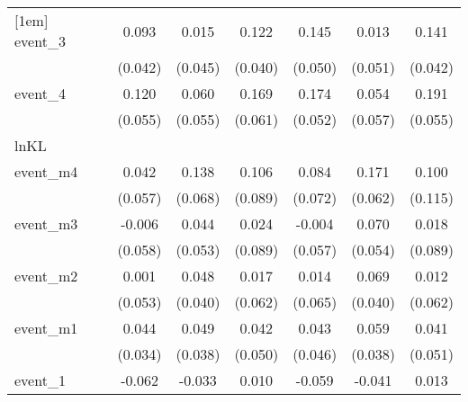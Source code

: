 {\begin{tabular}{l*{6}{c}}
[1em]
event\_3     &       0.093\sym{*}  &       0.015         &       0.122\sym{**} &       0.145\sym{**} &       0.013         &       0.141\sym{***}\\
            &     (0.042)         &     (0.045)         &     (0.040)         &     (0.050)         &     (0.051)         &     (0.042)         \\
[1em]
event\_4     &       0.120\sym{*}  &       0.060         &       0.169\sym{**} &       0.174\sym{***}&       0.054         &       0.191\sym{***}\\
            &     (0.055)         &     (0.055)         &     (0.061)         &     (0.052)         &     (0.057)         &     (0.055)         \\
\hline
lnKL        &                     &                     &                     &                     &                     &                     \\
event\_m4    &       0.042         &       0.138\sym{*}  &       0.106         &       0.084         &       0.171\sym{**} &       0.100         \\
            &     (0.057)         &     (0.068)         &     (0.089)         &     (0.072)         &     (0.062)         &     (0.115)         \\
[1em]
event\_m3    &      -0.006         &       0.044         &       0.024         &      -0.004         &       0.070         &       0.018         \\
            &     (0.058)         &     (0.053)         &     (0.089)         &     (0.057)         &     (0.054)         &     (0.089)         \\
[1em]
event\_m2    &       0.001         &       0.048         &       0.017         &       0.014         &       0.069         &       0.012         \\
            &     (0.053)         &     (0.040)         &     (0.062)         &     (0.065)         &     (0.040)         &     (0.062)         \\
[1em]
event\_m1    &       0.044         &       0.049         &       0.042         &       0.043         &       0.059         &       0.041         \\
            &     (0.034)         &     (0.038)         &     (0.050)         &     (0.046)         &     (0.038)         &     (0.051)         \\
[1em]
event\_1     &      -0.062\sym{*}  &      -0.033         &       0.010         &      -0.059         &      -0.041         &       0.013         \\

\end{tabular}}
